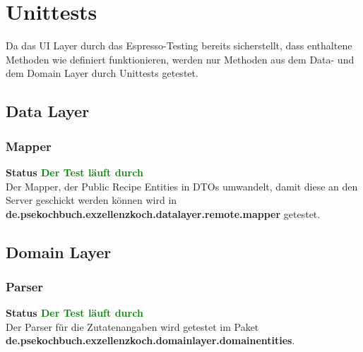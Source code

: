 \chapter{Unittests}
Da das UI Layer durch das Espresso-Testing bereits sicherstellt, dass enthaltene Methoden wie definiert funktionieren, werden nur Methoden aus dem Data- und dem Domain Layer durch Unittests getestet.

\section{Data Layer}
\subsection{Mapper}
\textbf{Status \textcolor{green}{Der Test läuft durch} \\}
Der Mapper, der Public Recipe Entities in DTOs umwandelt, damit diese an den Server geschickt werden können wird in \\
\textbf{de.psekochbuch.exzellenzkoch.datalayer.remote.mapper} getestet.


\section{Domain Layer}
\subsection{Parser}
\textbf{Status \textcolor{green}{ Der Test läuft durch}} \\
Der Parser für die Zutatenangaben wird getestet im Paket \\
\textbf{de.psekochbuch.exzellenzkoch.domainlayer.domainentities}.